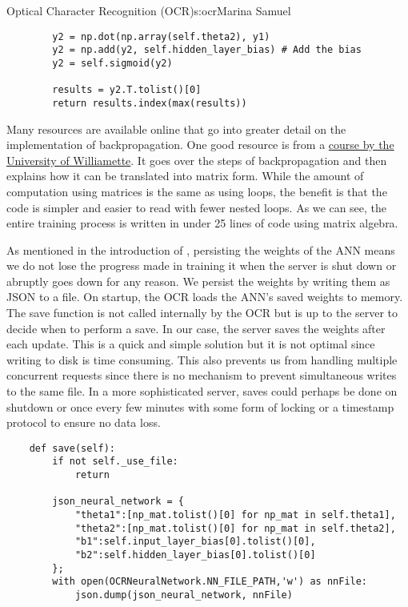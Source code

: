 \begin{aosachapter}{Optical Character Recognition (OCR)}{s:ocr}{Marina Samuel}
\begin{verbatim}
        y2 = np.dot(np.array(self.theta2), y1)
        y2 = np.add(y2, self.hidden_layer_bias) # Add the bias
        y2 = self.sigmoid(y2)

        results = y2.T.tolist()[0]
        return results.index(max(results))
\end{verbatim}

\label{other-design-decisions-ocr.py}

Many resources are available online that go into greater detail on the
implementation of backpropagation. One good resource is from a
\href{http://www.willamette.edu/~gorr/classes/cs449/backprop.html}{course
by the University of Williamette}. It goes over the steps of
backpropagation and then explains how it can be translated into matrix
form. While the amount of computation using matrices is the same as
using loops, the benefit is that the code is simpler and easier to read
with fewer nested loops. As we can see, the entire training process is
written in under 25 lines of code using matrix algebra.

As mentioned in the introduction of ,
persisting the weights of the ANN means we do not lose the progress made
in training it when the server is shut down or abruptly goes down for
any reason. We persist the weights by writing them as JSON to a file. On
startup, the OCR loads the ANN's saved weights to memory. The save
function is not called internally by the OCR but is up to the server to
decide when to perform a save. In our case, the server saves the weights
after each update. This is a quick and simple solution but it is not
optimal since writing to disk is time consuming. This also prevents us
from handling multiple concurrent requests since there is no mechanism
to prevent simultaneous writes to the same file. In a more sophisticated
server, saves could perhaps be done on shutdown or once every few
minutes with some form of locking or a timestamp protocol to ensure no
data loss.

\begin{verbatim}
    def save(self):
        if not self._use_file:
            return

        json_neural_network = {
            "theta1":[np_mat.tolist()[0] for np_mat in self.theta1],
            "theta2":[np_mat.tolist()[0] for np_mat in self.theta2],
            "b1":self.input_layer_bias[0].tolist()[0],
            "b2":self.hidden_layer_bias[0].tolist()[0]
        };
        with open(OCRNeuralNetwork.NN_FILE_PATH,'w') as nnFile:
            json.dump(json_neural_network, nnFile)


\end{verbatim}
\end{aosachapter}
